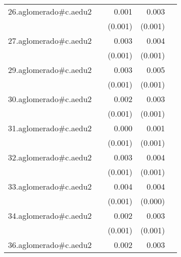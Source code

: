 {\begin{longtable}{l*{4}{D{.}{.}{-1}}}
\addlinespace
26.aglomerado#c.aedu2&                     &       0.001         &       0.003\sym{*}  &                     \\
            &                     &     (0.001)         &     (0.001)         &                     \\
\addlinespace
27.aglomerado#c.aedu2&                     &       0.003\sym{*}  &       0.004\sym{***}&                     \\
            &                     &     (0.001)         &     (0.001)         &                     \\
\addlinespace
29.aglomerado#c.aedu2&                     &       0.003\sym{**} &       0.005\sym{***}&                     \\
            &                     &     (0.001)         &     (0.001)         &                     \\
\addlinespace
30.aglomerado#c.aedu2&                     &       0.002         &       0.003\sym{**} &                     \\
            &                     &     (0.001)         &     (0.001)         &                     \\
\addlinespace
31.aglomerado#c.aedu2&                     &       0.000         &       0.001         &                     \\
            &                     &     (0.001)         &     (0.001)         &                     \\
\addlinespace
32.aglomerado#c.aedu2&                     &       0.003\sym{*}  &       0.004\sym{***}&                     \\
            &                     &     (0.001)         &     (0.001)         &                     \\
\addlinespace
33.aglomerado#c.aedu2&                     &       0.004\sym{***}&       0.004\sym{***}&                     \\
            &                     &     (0.001)         &     (0.000)         &                     \\
\addlinespace
34.aglomerado#c.aedu2&                     &       0.002         &       0.003\sym{***}&                     \\
            &                     &     (0.001)         &     (0.001)         &                     \\
\addlinespace
36.aglomerado#c.aedu2&                     &       0.002         &       0.003\sym{***}&                     \\

\end{longtable}}
